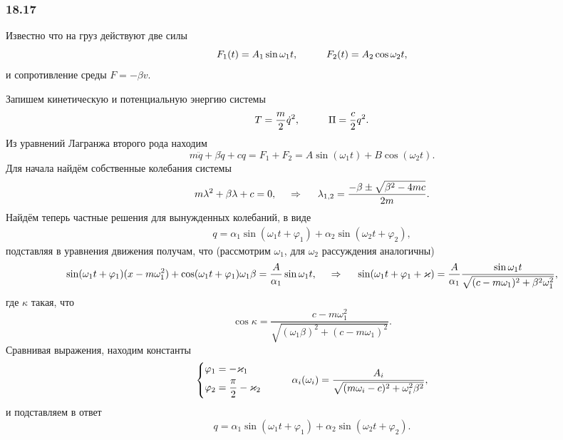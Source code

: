 \subsubsection*{18.17}


Известно что на груз действуют две силы
\begin{equation*}
    F_1 (t) = A_1 \sin \omega_1 t,
    \hspace{1 cm}
    F_2 (t) = A_2 \cos \omega_2 t,
\end{equation*}
и сопротивление среды $F = - \beta v$. 

Запишем кинетическую и потенциальную энергию системы
\begin{equation*}
    T = \frac{m}{2} \dot{q}^2, \hspace{1 cm}
    \Pi = \frac{c}{2}q^2.
\end{equation*}
Из уравнений Лагранжа второго рода находим
\begin{equation*}
    m \ddot{q} + \beta \dot{q} + c q = F_1 + F_2 = A \sin (\omega_1 t) + B \cos (\omega_2 t).
\end{equation*}
Для начала найдём собственные колебания системы
\begin{equation*}
    m \lambda^2 + \beta \lambda + c = 0,
    \hspace{0.5cm} \Rightarrow \hspace{0.5cm}
    \lambda_{1, 2} = \frac{-\beta \pm \sqrt{\beta^2 - 4 mc}}{2m}.
\end{equation*}
Найдём теперь частные решения для вынужденных колебаний, в виде
\begin{align*}
    q = \alpha_1 \sin (\omega_1 t + \varphi_1) + \alpha_2 \sin (\omega_2 t + \varphi_2),
\end{align*}
подставляя в уравнения движения получам, что (рассмотрим $\omega_1$, для $\omega_2$ рассуждения аналогичны)
\begin{equation*}
    \sin (\omega_1 t + \varphi_1) (x - m \omega_1^2) + \cos (\omega_1 t + \varphi_1) \omega_1 \beta = \frac{A}{\alpha_1}\sin \omega_1 t,
    \hspace{0.5cm} \Rightarrow \hspace{0.5cm}
    \sin(\omega_1 t + \varphi_1 + \kappa) = \frac{A}{\alpha_1} \frac{\sin \omega_1 t}{\sqrt{
    (c-m \omega_1)^2 + \beta^2 \omega_1^2
    }},
\end{equation*}
где $\kappa$ такая, что
\begin{equation*}
    \cos \kappa = \frac{c - m \omega_1^2}{\sqrt{
        (\omega_1 \beta)^2 + (c-m \omega_1)^2
    }}.
\end{equation*}
Сравнивая выражения, находим константы
\begin{equation*}
\left\{\begin{aligned}
        \varphi_1 &= - \kappa_1 \\
        \varphi_2 &= \frac{\pi}{2} - \kappa_2
\end{aligned}\right.
\hspace{1 cm}
    \alpha_i (\omega_i) = \frac{A_i}{\sqrt{(m \omega_i-c)^2+\omega_i^2 \beta^2}},
\end{equation*}
и подставляем в ответ
\begin{equation*}
    q = \alpha_1 \sin (\omega_1 t + \varphi_1) + \alpha_2 \sin (\omega_2 t + \varphi_2).
\end{equation*}